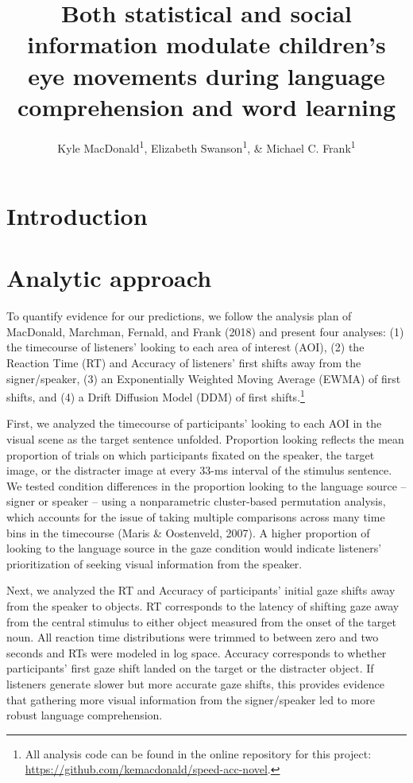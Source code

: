 \documentclass[man,floatsintext]{apa6}
\title{Both statistical and social information modulate children's eye
movements during language comprehension and word learning}
\author{Kyle MacDonald\textsuperscript{1}, Elizabeth Swanson\textsuperscript{1},
\& Michael C. Frank\textsuperscript{1}}
\date{}
\affiliation{
\vspace{0.5cm}
\textsuperscript{1} Stanford University}
\let\rmarkdownfootnote\footnote%
\def\footnote{\protect\rmarkdownfootnote}
\begin{document}
\maketitle

\hypertarget{introduction}{%
\section{Introduction}\label{introduction}}

\hypertarget{analytic-approach}{%
\section{Analytic approach}\label{analytic-approach}}

To quantify evidence for our predictions, we follow the analysis plan of
MacDonald, Marchman, Fernald, and Frank (2018) and present four
analyses: (1) the timecourse of listeners' looking to each area of
interest (AOI), (2) the Reaction Time (RT) and Accuracy of listeners'
first shifts away from the signer/speaker, (3) an Exponentially Weighted
Moving Average (EWMA) of first shifts, and (4) a Drift Diffusion Model
(DDM) of first shifts.\footnote{All analysis code can be found in the
  online repository for this project:
  \url{https://github.com/kemacdonald/speed-acc-novel}.}

First, we analyzed the timecourse of participants' looking to each AOI
in the visual scene as the target sentence unfolded. Proportion looking
reflects the mean proportion of trials on which participants fixated on
the speaker, the target image, or the distracter image at every 33-ms
interval of the stimulus sentence. We tested condition differences in
the proportion looking to the language source -- signer or speaker --
using a nonparametric cluster-based permutation analysis, which accounts
for the issue of taking multiple comparisons across many time bins in
the timecourse (Maris \& Oostenveld, 2007). A higher proportion of
looking to the language source in the gaze condition would indicate
listeners' prioritization of seeking visual information from the
speaker.

Next, we analyzed the RT and Accuracy of participants' initial gaze
shifts away from the speaker to objects. RT corresponds to the latency
of shifting gaze away from the central stimulus to either object
measured from the onset of the target noun. All reaction time
distributions were trimmed to between zero and two seconds and RTs were
modeled in log space. Accuracy corresponds to whether participants'
first gaze shift landed on the target or the distracter object. If
listeners generate slower but more accurate gaze shifts, this provides
evidence that gathering more visual information from the signer/speaker
led to more robust language comprehension.
\end{document}
